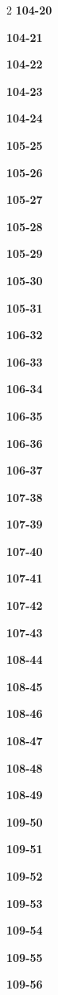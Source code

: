 \documentclass[10pt,a4paper]{article}
\begin{document}
\begin{multicols}{2}
\noindent\textbf{104-20}\ \par
\noindent\textbf{104-21}\ \par
\noindent\textbf{104-22}\ \par
\noindent\textbf{104-23}\ \par
\noindent\textbf{104-24}\ \par
\noindent\textbf{105-25}\ \par
\noindent\textbf{105-26}\ \par
\noindent\textbf{105-27}\ \par
\noindent\textbf{105-28}\ \par
\noindent\textbf{105-29}\ \par
\noindent\textbf{105-30}\ \par
\noindent\textbf{105-31}\ \par
\noindent\textbf{106-32}\ \par
\noindent\textbf{106-33}\ \par
\noindent\textbf{106-34}\ \par
\noindent\textbf{106-35}\ \par
\noindent\textbf{106-36}\ \par
\noindent\textbf{106-37}\ \par
\noindent\textbf{107-38}\ \par
\noindent\textbf{107-39}\ \par
\noindent\textbf{107-40}\ \par
\noindent\textbf{107-41}\ \par
\noindent\textbf{107-42}\ \par
\noindent\textbf{107-43}\ \par
\noindent\textbf{108-44}\ \par
\noindent\textbf{108-45}\ \par
\noindent\textbf{108-46}\ \par
\noindent\textbf{108-47}\ \par
\noindent\textbf{108-48}\ \par
\noindent\textbf{108-49}\ \par
\noindent\textbf{109-50}\ \par
\noindent\textbf{109-51}\ \par
\noindent\textbf{109-52}\ \par
\noindent\textbf{109-53}\ \par
\noindent\textbf{109-54}\ \par
\noindent\textbf{109-55}\ \par
\noindent\textbf{109-56}\ \par

\end{multicols}
\end{document}

